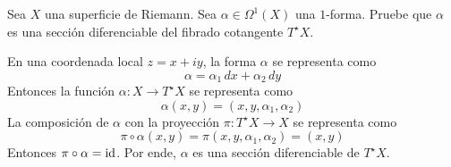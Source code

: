 \begin{exercise}
Sea $X$ una superficie de Riemann. Sea $\alpha \in \Omega^1(X)$ una $1$-forma. Pruebe que $\alpha$ es una sección diferenciable del fibrado cotangente $T^\star X$.
\end{exercise}

\begin{solution}
En una coordenada local $z = x + iy$, la forma $\alpha$ se representa como
$$\alpha = \alpha_1 \, dx + \alpha_2 \, dy$$
Entonces la función $\alpha : X \to T^\star X$ se representa como
$$\alpha(x, y) = (x, y, \alpha_1, \alpha_2)$$
La composición de $\alpha$ con la proyección $\pi : T^\star X \to X$ se representa como
$$\pi \circ \alpha(x, y) = \pi(x, y, \alpha_1, \alpha_2) = (x, y)$$
Entonces $\pi \circ \alpha = \operatorname{id}$. Por ende, $\alpha$ es una sección diferenciable de $T^\star X$.
\end{solution}
